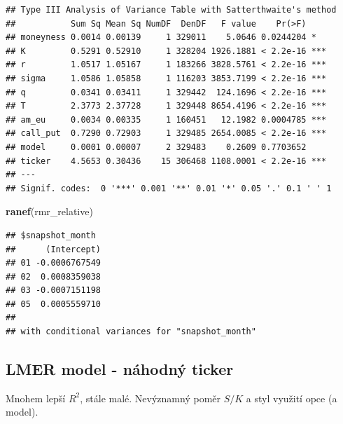 \documentclass[
]{article}
\newenvironment{Shaded}{\begin{snugshade}}{\end{snugshade}}
\newcommand{\FunctionTok}[1]{\textcolor[rgb]{0.13,0.29,0.53}{\textbf{#1}}}
\newcommand{\NormalTok}[1]{#1}
\begin{document}
\begin{verbatim}
## Type III Analysis of Variance Table with Satterthwaite's method
##           Sum Sq Mean Sq NumDF  DenDF   F value    Pr(>F)    
## moneyness 0.0014 0.00139     1 329011    5.0646 0.0244204 *  
## K         0.5291 0.52910     1 328204 1926.1881 < 2.2e-16 ***
## r         1.0517 1.05167     1 183266 3828.5761 < 2.2e-16 ***
## sigma     1.0586 1.05858     1 116203 3853.7199 < 2.2e-16 ***
## q         0.0341 0.03411     1 329442  124.1696 < 2.2e-16 ***
## T         2.3773 2.37728     1 329448 8654.4196 < 2.2e-16 ***
## am_eu     0.0034 0.00335     1 160451   12.1982 0.0004785 ***
## call_put  0.7290 0.72903     1 329485 2654.0085 < 2.2e-16 ***
## model     0.0001 0.00007     2 329483    0.2609 0.7703652    
## ticker    4.5653 0.30436    15 306468 1108.0001 < 2.2e-16 ***
## ---
## Signif. codes:  0 '***' 0.001 '**' 0.01 '*' 0.05 '.' 0.1 ' ' 1
\end{verbatim}

\begin{Shaded}
\begin{Highlighting}[]
\FunctionTok{ranef}\NormalTok{(rmr\_relative)}
\end{Highlighting}
\end{Shaded}

\begin{verbatim}
## $snapshot_month
##      (Intercept)
## 01 -0.0006767549
## 02  0.0008359038
## 03 -0.0007151198
## 05  0.0005559710
## 
## with conditional variances for "snapshot_month"
\end{verbatim}

\subsection{LMER model - náhodný
ticker}\label{lmer-model---nuxe1hodnuxfd-ticker}

Mnohem lepší \(R^2\), stále malé. Nevýznamný poměr \(S/K\) a styl
využití opce (a model).
\end{document}
